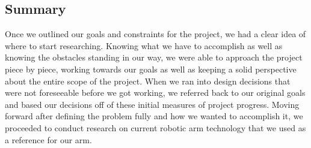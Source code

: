 {\subsection{Summary}
\noindent Once we outlined our goals and constraints for the project, we had a clear idea of where to start researching. Knowing what we have to accomplish as well as knowing the obstacles standing in our way, we were able to approach the project piece by piece, working towards our goals as well as keeping a solid perspective about the entire scope of the project. When we ran into design decisions that were not foreseeable before we got working, we referred back to our original goals and based our decisions off of these initial measures of project progress. Moving forward after defining the problem fully and how we wanted to accomplish it, we proceeded to conduct research on current robotic arm technology that we used as a reference for our arm.  

}
